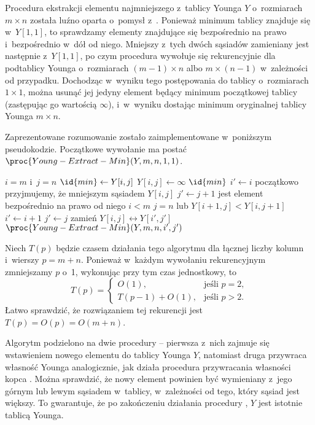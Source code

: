 \subproblem %
Procedura ekstrakcji elementu najmniejszego z~tablicy Younga $Y$ o~rozmiarach $m\times n$ została luźno oparta o~pomysł z~. Ponieważ minimum tablicy znajduje się w~$Y[1,1]$, to sprawdzamy elementy znajdujące się bezpośrednio na prawo i~bezpośrednio w~dół od niego. Mniejszy z~tych dwóch sąsiadów zamieniany jest następnie z~$Y[1,1]$, po czym procedura wywołuje się rekurencyjnie dla podtablicy Younga o~rozmiarach $(m-1)\times n$ albo $m\times(n-1)$ w~zależności od przypadku. Dochodząc w~wyniku tego postępowania do tablicy o~rozmiarach $1\times1$, można usunąć jej jedyny element będący minimum początkowej tablicy (zastępując go wartością $\infty$), i~w~wyniku dostając minimum oryginalnej tablicy Younga $m\times n$.

Zaprezentowane rozumowanie zostało zaimplementowane w~poniższym pseudokodzie. Początkowe wywołanie ma postać $\proc{Young-Extract-Min}(Y,m,n,1,1)$.

\begin{codebox}
\li	\If $i=m$ i~$j=n$
\li		\Then
			$\id{min}\gets Y[i,j]$
\li			$Y[i,j]\gets\infty$
\li			\Return $\id{min}$
		\End
\li		$i'\gets i$ \>\>\>\Comment początkowo przyjmujemy, że mniejszym sąsiadem $Y[i,j]$
\li		$j'\gets j+1$ \>\>\>\> jest element bezpośrednio na prawo od niego
\li	\If $i<m$
\li		\Then
			\If $j=n$ lub $Y[i+1,j]<Y[i,j+1]$
\li				\Then
					$i'\gets i+1$
\li					$j'\gets j$
				\End
		\End
\li zamień $Y[i,j]\leftrightarrow Y[i',j']$
\li	\Return $\proc{Young-Extract-Min}(Y,m,n,i',j')$
\end{codebox}

Niech $T(p)$ będzie czasem działania tego algorytmu dla łącznej liczby kolumn i~wierszy $p=m+n$. Ponieważ w~każdym wywołaniu rekurencyjnym zmniejszamy $p$ o~1, wykonując przy tym czas jednostkowy, to
\[
	T(p) =
	\begin{cases}
		O(1), & \text{jeśli $p=2$}, \\
		T(p-1) + O(1), & \text{jeśli $p>2$}.
	\end{cases}
\]
Łatwo sprawdzić, że rozwiązaniem tej rekurencji jest $T(p)=O(p)=O(m+n)$.

\subproblem %
Algorytm podzielono na dwie procedury -- pierwsza z~nich zajmuje się wstawieniem nowego elementu do tablicy Younga $Y$, natomiast druga przywraca własność Younga analogicznie, jak działa procedura przywracania własności kopca . Można sprawdzić, że nowy element powinien być wymieniany z~jego górnym lub lewym sąsiadem w~tablicy, w~zależności od tego, który sąsiad jest większy. To gwarantuje, że po zakończeniu działania procedury , $Y$ jest istotnie tablicą Younga.

